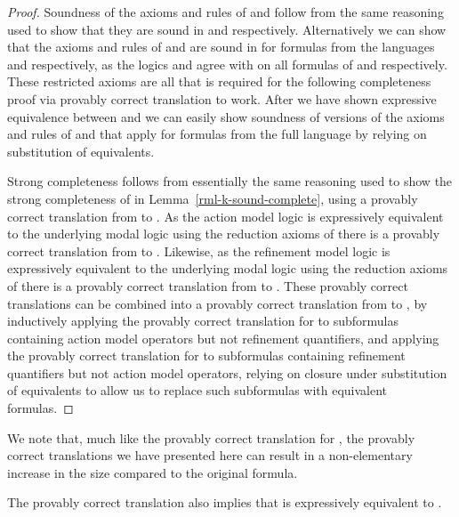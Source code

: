 \begin{proof}[Proof]
Soundness of the axioms and rules of \axiomAmlK{} and \axiomRmlK{} follow from the same reasoning used to show that they are sound in \logicAmlK{} and \logicRmlK{} respectively.
Alternatively we can show that the axioms and rules of \axiomAmlK{} and \axiomRmlK{} are sound in \logicRamlK{} for formulas from the languages \langAml{} and \langRml{} respectively, as the logics \logicAmlK{} and \logicRmlK{} agree with \logicRamlK{} on all formulas of \langAml{} and \langRml{} respectively.
These restricted axioms are all that is required for the following completeness proof via provably correct translation to work.
After we have shown expressive equivalence between \logicRamlK{} and \logicK{} we can easily show soundness of versions of the axioms and rules of \axiomAmlK{} and \axiomRmlK{} that apply for formulas from the full language \langAaml{} by relying on substitution of equivalents.

Strong completeness follows from essentially the same reasoning used to show the strong completeness of \axiomRmlK{} in Lemma~\ref{rml-k-sound-complete}, using a provably correct translation from \langAaml{} to \langMl{}.
As the action model logic \logicAmlK{} is expressively equivalent to the underlying modal logic \logicK{} using the reduction axioms of \axiomAmlK{} there is a provably correct translation from \langAml{} to \langMl{}.
Likewise, as the refinement model logic \logicRmlK{} is expressively equivalent to the underlying modal logic \logicK{} using the reduction axioms of \axiomRmlK{} there is a provably correct translation from \langRml{} to \langMl{}.
These provably correct translations can be combined into a provably correct translation from \langAaml{} to \langMl{}, by inductively applying the provably correct translation for \logicAmlK{} to subformulas containing action model operators but not refinement quantifiers, and applying the provably correct translation for \logicRmlK{} to subformulas containing refinement quantifiers but not action model operators, relying on closure under substitution of equivalents to allow us to replace such subformulas with equivalent \langMl{} formulas.
\end{proof}

We note that, much like the provably correct translation for \logicRmlK{}, the provably correct translations we have presented here can result in a non-elementary increase in the size compared to the original formula.

The provably correct translation also implies that \logicRamlK{} is expressively equivalent to \logicK{}.

